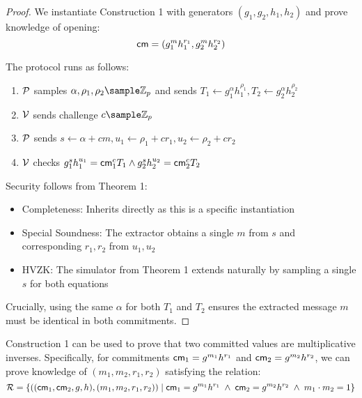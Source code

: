 \begin{proof}
    We instantiate Construction 1 with generators $(g_1, g_2, h_1, h_2)$ and prove knowledge of opening:
    \[
    \mathsf{cm} = (g_1^m h_1^{r_1}, g_2^m h_2^{r_2})
    \]
    
\noindent    The protocol runs as follows:
    \begin{enumerate}
        \item $\mathcal{P}$ samples $\alpha, \rho_1, \rho_2 \sample \Z_p$ and sends $T_1 \gets g_1^{\alpha}h_1^{\rho_1}, T_2 \gets g_2^{\alpha}h_2^{\rho_2}$
        \item $\mathcal{V}$ sends challenge $c \sample \Z_p$
        \item $\mathcal{P}$ sends $s \gets \alpha + cm, u_1 \gets \rho_1 + cr_1, u_2 \gets \rho_2 + cr_2$
        \item $\mathcal{V}$ checks $g_1^s h_1^{u_1} = \mathsf{cm}_1^c T_1 \wedge g_2^s h_2^{u_2} = \mathsf{cm}_2^c T_2$
    \end{enumerate}

\noindent Security follows from Theorem 1:
    \begin{itemize}
        \item Completeness: Inherits directly as this is a specific instantiation
        \item Special Soundness: The extractor obtains a single $m$ from $s$ and corresponding $r_1, r_2$ from $u_1, u_2$
        \item HVZK: The simulator from Theorem 1 extends naturally by sampling a single $s$ for both equations
    \end{itemize}
    
    Crucially, using the same $\alpha$ for both $T_1$ and $T_2$ ensures the extracted message $m$ must be identical in both commitments.
\end{proof}

\begin{corollary}
    Construction 1 can be used to prove that two committed values are multiplicative inverses. Specifically, for commitments $\mathsf{cm}_1 = g^{m_1}h^{r_1}$ and $\mathsf{cm}_2 = g^{m_2}h^{r_2}$, we can prove knowledge of $(m_1, m_2, r_1, r_2)$ satisfying the relation:
    \[
    \mathcal{R} = \left\{ ((\mathsf{cm}_1, \mathsf{cm}_2, g, h), (m_1, m_2, r_1, r_2)) \; | \; \mathsf{cm}_1 = g^{m_1}h^{r_1} \; \wedge \; \mathsf{cm}_2 = g^{m_2}h^{r_2} \; \wedge \; m_1 \cdot m_2 = 1 \right\}
    \]    
\end{corollary}

